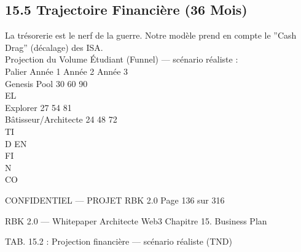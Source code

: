 \documentclass[12pt,landscape,a4paper]{article}
\newenvironment{confidential}
{\begin{tcolorbox}[
    colback=rbkred!5!white,
    colframe=rbkred!75!black,
    title=CONFIDENTIEL,
    fonttitle=\bfseries\color{white},
    coltitle=rbkred!75!black,
    breakable,
    enhanced,
    frame hidden,
    borderline west={2pt}{0pt}{rbkred!75!black}
]}
{\end{tcolorbox}}
\begin{document}
\subsection{15.5 Trajectoire Financière (36 Mois)}
La trésorerie est le nerf de la guerre. Notre modèle prend en compte le ”Cash Drag” (décalage) des ISA.\\
Projection du Volume Étudiant (Funnel) — scénario réaliste :\\
\vspace{0.5em}
Palier               Année 1 Année 2 Année 3\\
Genesis Pool           30      60      90\\
\vspace{0.5em}
\vspace{0.5em}
\vspace{0.5em}
\vspace{0.5em}
EL\\
Explorer               27      54      81\\
Bâtisseur/Architecte   24      48      72\\
\vspace{0.5em}
\vspace{0.5em}
\vspace{0.5em}
\vspace{0.5em}
TI\\
D   EN\\
FI\\
N\\
CO\\
\vspace{0.5em}
\vspace{0.5em}
\vspace{0.5em}
\vspace{0.5em}
\begin{confidential}CONFIDENTIEL — PROJET RBK 2.0                               Page 136 sur 316\end{confidential}
RBK 2.0 — Whitepaper Architecte Web3                                                                                Chapitre 15. Business Plan\\
\vspace{0.5em}
\vspace{0.5em}
\begin{center}\begin{tabular}TAB. 15.2 : Projection financière — scénario réaliste (TND)\end{tabular}\end{center}
\vspace{0.5em}
\end{document}
